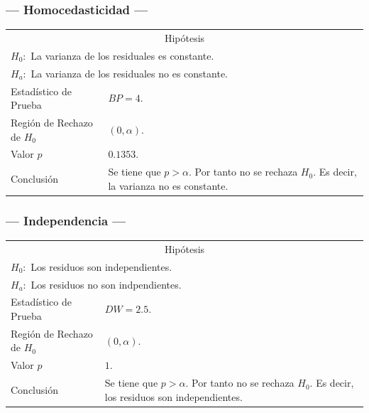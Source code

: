 \subsubsection{--- Homocedasticidad ---} %
\begin{center}
  \begin{tabular}{|l|p{8cm}|}
    \cline{1-2}
    \multicolumn{2}{|c|}{Hipótesis}\\ \cline{1-2}
    \multicolumn{2}{|l|}{\(H_0:\) La varianza de los residuales es constante.} \\ 
    \multicolumn{2}{|l|}{\(H_a:\) La varianza de los residuales no es constante.} \\ \cline{1-2}
    Estadístico de Prueba & \(BP = 4\).\\ \cline{1-2} 
		Región de Rechazo de \(H_0\) & \((0, \alpha )\).\\ \cline{1-2} 
    Valor \(p\) & \(0.1353\).\\ \cline{1-2} 
    Conclusión & Se tiene que \(p> \alpha\). \newline 
		Por tanto no se rechaza \(H_0\). \newline 
		Es decir, la varianza no es constante. \\ \cline{1-2} 
  \end{tabular}
\end{center}

\subsubsection{--- Independencia ---} %
\begin{center}
  \begin{tabular}{|l|p{8cm}|}
    \cline{1-2}
    \multicolumn{2}{|c|}{Hipótesis}\\ \cline{1-2}
    \multicolumn{2}{|l|}{\(H_0:\) Los residuos son independientes.} \\ 
    \multicolumn{2}{|l|}{\(H_a:\) Los residuos no son indpendientes.} \\ \cline{1-2}
    Estadístico de Prueba & \(DW = 2.5\).\\ \cline{1-2} 
		Región de Rechazo de \(H_0\) & \((0, \alpha )\).\\ \cline{1-2} 
    Valor \(p\) & \(1\).\\ \cline{1-2} 
    Conclusión & Se tiene que \(p> \alpha\). \newline 
		Por tanto no se rechaza \(H_0\). \newline 
		Es decir, los residuos son independientes.\\ \cline{1-2} 
  \end{tabular}
\end{center}

